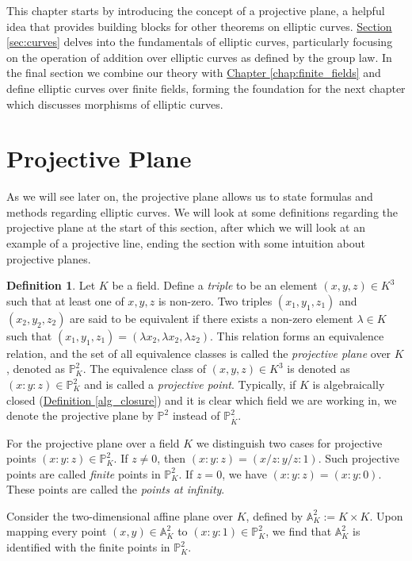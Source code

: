 \documentclass[openany, a4paper, 10pt]{book}
\theoremstyle{plain}
\theoremstyle{plain}
\theoremstyle{plain}
\theoremstyle{definition}
\newtheorem{definition}[theorem]{Definition}
\theoremstyle{plain}
\theoremstyle{definition}
\theoremstyle{remark}
\newcommand{\defref}[1]{\hyperref[#1]{Definition \ref{#1}}}
\newcommand{\secref}[1]{\hyperref[#1]{Section \ref{#1}}}
\newcommand{\chapref}[1]{\hyperref[#1]{Chapter \ref{#1}}}
\begin{document}
This chapter starts by introducing the concept of a projective plane, a helpful idea that provides building blocks for other theorems on elliptic curves.
\secref{sec:curves} delves into the fundamentals of elliptic curves, particularly focusing on the operation of addition over elliptic curves as defined by the group law.
In the final section we combine our theory with \chapref{chap:finite_fields} and define elliptic curves over finite fields, forming the foundation for the next chapter which discusses morphisms of elliptic curves.

\section{Projective Plane}\label{sec:proj_space}
As we will see later on, the projective plane allows us to state formulas and methods regarding elliptic curves.
We will look at some definitions regarding the projective plane at the start of this section, after which we will look at an example of a projective line, ending the section with some intuition about projective planes.

\begin{definition}
    Let $K$ be a field.
    Define a \textit{triple} to be an element $(x,y,z) \in K^3$ such that at least one of $x,y,z$ is non-zero.
    Two triples $(x_1,y_1,z_1)$ and $(x_2, y_2, z_2)$ are said to be equivalent if there exists a non-zero element $\lambda \in K$ such that $(x_1, y_1, z_1) = (\lambda x_2, \lambda x_2, \lambda z_2)$.
    This relation forms an equivalence relation, and the set of all equivalence classes is called the \textit{projective plane} over $K$, denoted as $\mathbb P^2_K$.
    The equivalence class of $(x, y, z) \in K^3$ is denoted as $(x:y:z) \in \mathbb P^2_K$ and is called a \textit{projective point}.
    Typically, if $K$ is algebraically closed (\defref{alg_closure}) and it is clear which field we are working in, we denote the projective plane by $\mathbb P^2$ instead of $\mathbb P^2_{\overline K}$.
\end{definition}
For the projective plane over a field $K$ we distinguish two cases for projective points $(x:y:z) \in \mathbb P^2_K$.
If $z \neq 0$, then $(x:y:z) = (x/z: y/z: 1)$.
Such projective points are called \textit{finite} points in $\mathbb P^2_K$.
If $z = 0$, we have $(x:y:z)=(x:y:0)$.
These points are called the \textit{points at infinity}.

Consider the two-dimensional affine plane over $K$, defined by $\mathbb A^2_K := K\times K$.
Upon mapping every point $(x,y) \in \mathbb A^2_K$ to $(x:y:1) \in \mathbb P_K^2$, we find that $\mathbb A^2_K$ is identified with the finite points in $\mathbb P^2_K$.
\end{document}
